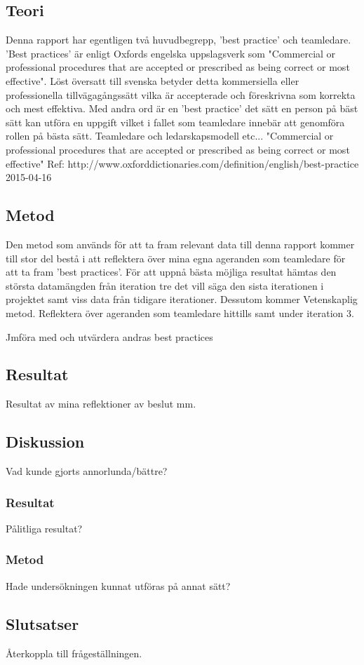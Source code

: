 \subsection{Teori}
Denna rapport har egentligen två huvudbegrepp, 'best practice' och teamledare. 'Best practices' är enligt Oxfords engelska uppslagsverk som "Commercial or professional procedures that are accepted or prescribed as being correct or most effective". Löst översatt till svenska betyder detta kommersiella eller professionella tillvägagångssätt vilka är accepterade och föreskrivna som korrekta och mest effektiva. Med andra ord är en 'best practice' det sätt en person på bäst sätt kan utföra en uppgift vilket i fallet som teamledare innebär att genomföra rollen på bästa sätt. 
\newline \newline
Teamledare och ledarskapsmodell etc...
"Commercial or professional procedures that are accepted or prescribed as being correct or most effective"
\newline \newline
Ref: http://www.oxforddictionaries.com/definition/english/best-practice 2015-04-16

\subsection{Metod}
Den metod som används för att ta fram relevant data till denna rapport kommer till stor del bestå i att reflektera över mina egna ageranden som teamledare för att ta fram 'best practices'. För att uppnå bästa möjliga resultat hämtas den största datamängden från iteration tre det vill säga den sista iterationen i projektet samt viss data från tidigare iterationer. Dessutom kommer 
\newline \newline
Vetenskaplig metod. Reflektera över ageranden som teamledare hittills samt under iteration 3. 

Jmföra med och utvärdera andras best practices

\subsection{Resultat}
Resultat av mina reflektioner av beslut mm.

\subsection{Diskussion}
Vad kunde gjorts annorlunda/bättre?

\subsubsection{Resultat}
Pålitliga resultat? 

\subsubsection{Metod}
Hade undersökningen kunnat utföras på annat sätt?

\subsection{Slutsatser}
Återkoppla till frågeställningen.
